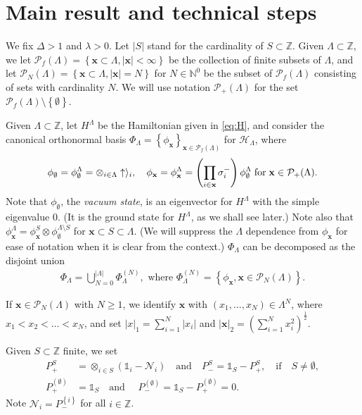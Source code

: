 \documentclass[12pt, a4paper,reqno]{amsart}
\numberwithin{equation}{section}
\newcommand\N{\mathbb N}
\newcommand\Z{\mathbb Z}
\newcommand\x{\mathbf{x}}
\newcommand\cN{\mathcal{N}}
\newcommand\cH{\mathcal{H}}
\newcommand\cP{\mathcal{P}}
\newcommand\be{\begin{equation}\begin{aligned}}
\newcommand\ee{\end{aligned}\end{equation}}
\newcommand{\abs}[1]{\left\lvert #1 \right\rvert}
\newcommand{\set}[1]{\left\{ #1 \right\}}
\newcommand{\pa}[1]{\left( #1 \right)}
\newcommand\La{\Lambda}
\newcommand{\eq}[1]{\eqref{#1}}
\newcommand{\up}[1]{^{\left(#1\right)}}
\newcommand{\qtx}[1]{\quad\text{#1}\quad}
\newcommand{\sqtx}[1]{\;\text{#1}\;}
\begin{document}
 
   
 



\section{Main result and technical steps}\label{secfinvol}
 We fix $\Delta>1$ and $ \lambda >0$.  Let $\abs{S}$ stand for the cardinality of $S\subset \Z$. Given  $ \La \subset \Z$, we let $\cP_f(\La)=\set{\x\subset  \La,  \abs{\x}<\infty}$ be the collection of  finite  subsets of $\La$,  and let $\cP_N(\La)=\set{\x\subset  \La, \abs{\x}=N}$ for $N\in\N^0$ be  the  subset of $\cP_f(\La)$ consisting of sets with cardinality $N$. We will use notation $\cP_+(\La)$ for  the  set  $\cP_f(\La)\setminus\set{\emptyset}$.  
 
 Given  $ \La \subset \Z$,  let $H^\La$ be the Hamiltonian  given in \eq{eq:H}, and consider the canonical orthonormal basis $\Phi_\La=\set{\phi_\x}_{\x \in \cP_f(\La)}$  for $\cH_\La$, where
 \be
 \phi_\emptyset=\phi_\emptyset^\La=\otimes_{i \in \Lambda}\uparrow\rangle_i, \quad \phi_{\bf x}=\phi_{\bf x}^\La=\pa{\prod_{i\in {\bf x}}\sigma_i^-}\phi_\emptyset^\La \sqtx{for} \x \in \cP_+(\La).
 \ee
 Note that $\phi_\emptyset$, the {\it vacuum state}, is an eigenvector for $H^\La$ with the simple eigenvalue $0$.  (It is the  ground state for $H^\La$,  as we shall see later.) Note also that $\phi_\x^\La=  \phi_\x^S \otimes  \phi_\emptyset^{\La\setminus S}$ for $ \x \subset S \subset \La$.   (We will suppress the $\La$ dependence from $\phi_\x$ for ease of notation when it is clear from the context.)
$ \Phi_\La$ can be decomposed as the disjoint union
\be\label{eq:basis}
 \Phi_\La=\bigcup_{N=0}^{\abs{\La}}  \Phi_\La\up{N}, \mbox{ where }\Phi_\La\up{N}=\set{\phi_\x, \x \in \cP_N(\La)}.  
 \ee


   If  $\x \in \cP_N(\La)$ with $N\ge 1$, we identify $\x$ with $(x_1,\ldots,x_N)\in \La^N$, where $x_1<x_2<\ldots<x_N$,  and set $\abs{x}_1= \sum_{i=1}^N \abs{x_i}$ and  $\abs{\x}_2=\pa{\sum_{i=1}^N x_i^2}^{\frac 12}$. 




  Given $ S\subset \Z$ finite, we set
\be\label{eq:P_+}
P_+^S&=\otimes_{i\in S}\pa{{\mathds{1}_{i}}-\cN_i} \qtx{and}  P_-^S=\mathds{1}_S-P_+^S, \qtx{if} S\ne \emptyset,\\
 P_+\up{\emptyset }& =\mathds{1}_S \qtx{and } P_-\up{\emptyset }=\mathds{1}_S- P_+\up{\emptyset }=0.
\ee
Note $\cN_i= P_-^{\set{i}}$ for all $i\in \Z$.
\end{document}
